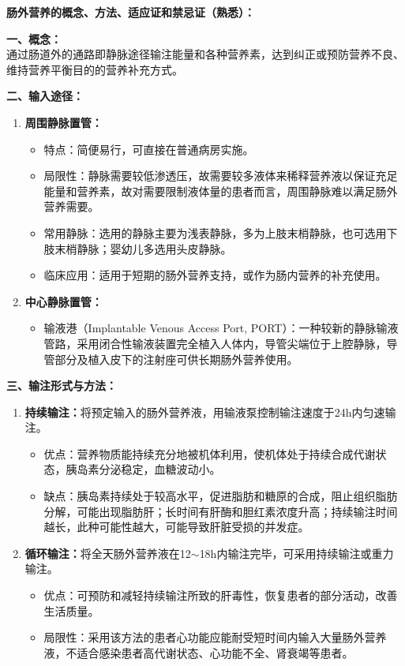 \begin{tipbox}
\textbf{肠外营养的概念、方法、适应证和禁忌证（熟悉）：}

\textbf{一、概念：}\\
通过肠道外的通路即静脉途径输注能量和各种营养素，达到纠正或预防营养不良、维持营养平衡目的的营养补充方式。

\textbf{二、输入途径：}
\begin{enumerate}[leftmargin=*]
    \item \textbf{周围静脉置管：}
    \begin{itemize}[leftmargin=*]
        \item 特点：简便易行，可直接在普通病房实施。
        \item 局限性：静脉需要较低渗透压，故需要较多液体来稀释营养液以保证充足能量和营养素，故对需要限制液体量的患者而言，周围静脉难以满足肠外营养需要。
        \item 常用静脉：选用的静脉主要为浅表静脉，多为上肢末梢静脉，也可选用下肢末梢静脉；婴幼儿多选用头皮静脉。
        \item 临床应用：适用于短期的肠外营养支持，或作为肠内营养的补充使用。
    \end{itemize}
    \item \textbf{中心静脉置管：}
    \begin{itemize}[leftmargin=*]
        \item 输液港（Implantable Venous Access Port, PORT）：一种较新的静脉输液管路，采用闭合性输液装置完全植入人体内，导管尖端位于上腔静脉，导管部分及植入皮下的注射座可供长期肠外营养使用。
    \end{itemize}
\end{enumerate}

\textbf{三、输注形式与方法：}
\begin{enumerate}[leftmargin=*]
    \item \textbf{持续输注：}将预定输入的肠外营养液，用输液泵控制输注速度于24h内匀速输注。
    \begin{itemize}[leftmargin=*]
        \item 优点：营养物质能持续充分地被机体利用，使机体处于持续合成代谢状态，胰岛素分泌稳定，血糖波动小。
        \item 缺点：胰岛素持续处于较高水平，促进脂肪和糖原的合成，阻止组织脂肪分解，可能出现脂肪肝；长时间有肝酶和胆红素浓度升高；持续输注时间越长，此种可能性越大，可能导致肝脏受损的并发症。
    \end{itemize}
    \item \textbf{循环输注：}将全天肠外营养液在12$\sim$18h内输注完毕，可采用持续输注或重力输注。
    \begin{itemize}[leftmargin=*]
        \item 优点：可预防和减轻持续输注所致的肝毒性，恢复患者的部分活动，改善生活质量。
        \item 局限性：采用该方法的患者心功能应能耐受短时间内输入大量肠外营养液，不适合感染患者高代谢状态、心功能不全、肾衰竭等患者。
    \end{itemize}
\end{enumerate}


\end{tipbox}
